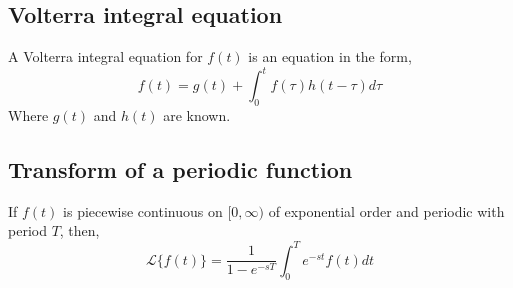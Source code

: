 \subsection{Volterra integral equation}

A Volterra integral equation for $f(t)$ is an equation in the form,
\[
    f(t) = g(t) + \int_0^t f(\tau) h(t - \tau) d\tau
\]
Where $g(t)$ and $h(t)$ are known.

\subsection{Transform of a periodic function}

\begin{theorem}
    If $f(t)$ is piecewise continuous on $[0, \infty)$ of exponential order and periodic with period $T$, then,
    \[
        \mathscr{L}\{f(t)\} = \frac{1}{1 - e^{-sT}} \int_0^T e^{-st}f(t)dt
    \]
\end{theorem}